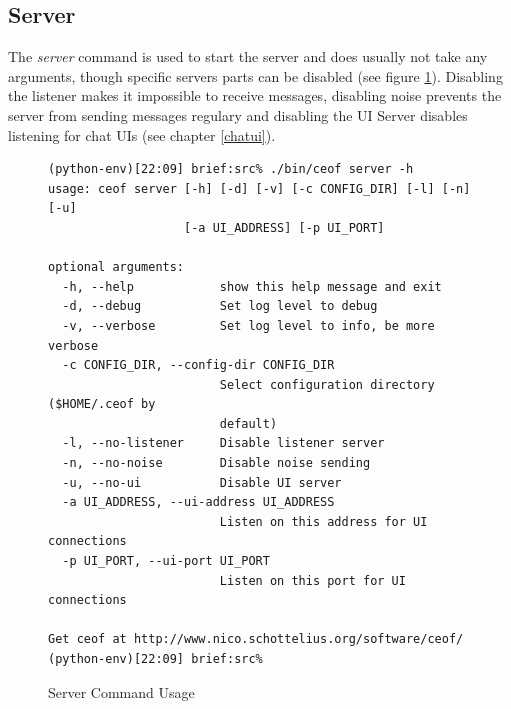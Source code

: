 \subsection{Server}
The \textit{server} command is used to start
the server and does usually not take any arguments,
though specific servers parts can be disabled
(see figure \ref{serverusage}). Disabling the listener
makes it impossible to receive messages, disabling
noise prevents the server from sending messages regulary
and disabling the UI Server disables listening for chat
UIs (see chapter \ref{chatui}).
\begin{figure}[htbp][htb]
\caption{Server Command Usage}
\label{serverusage}
\begin{verbatim}
(python-env)[22:09] brief:src% ./bin/ceof server -h
usage: ceof server [-h] [-d] [-v] [-c CONFIG_DIR] [-l] [-n] [-u]
                   [-a UI_ADDRESS] [-p UI_PORT]

optional arguments:
  -h, --help            show this help message and exit
  -d, --debug           Set log level to debug
  -v, --verbose         Set log level to info, be more verbose
  -c CONFIG_DIR, --config-dir CONFIG_DIR
                        Select configuration directory ($HOME/.ceof by
                        default)
  -l, --no-listener     Disable listener server
  -n, --no-noise        Disable noise sending
  -u, --no-ui           Disable UI server
  -a UI_ADDRESS, --ui-address UI_ADDRESS
                        Listen on this address for UI connections
  -p UI_PORT, --ui-port UI_PORT
                        Listen on this port for UI connections

Get ceof at http://www.nico.schottelius.org/software/ceof/
(python-env)[22:09] brief:src% 
\end{verbatim}
\end{figure}
